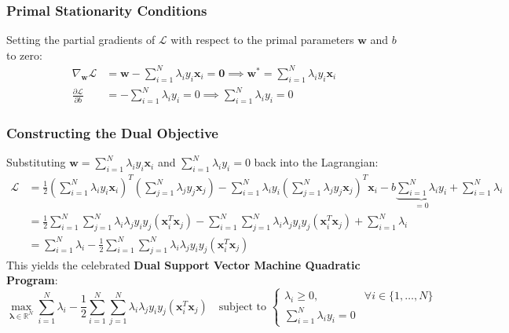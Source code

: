 \subsubsection{Primal Stationarity Conditions}
Setting the partial gradients of $\mathcal{L}$ with respect to the primal parameters $\mathbf{w}$ and $b$ to zero:
\begin{align}
\nabla_{\mathbf{w}} \mathcal{L} &= \mathbf{w} - \sum_{i=1}^N \lambda_i y_i \mathbf{x}_i = \mathbf{0} \implies \mathbf{w}^* = \sum_{i=1}^N \lambda_i y_i \mathbf{x}_i \label{eq:svm_w_stat} \\
\frac{\partial \mathcal{L}}{\partial b} &= -\sum_{i=1}^N \lambda_i y_i = 0 \implies \sum_{i=1}^N \lambda_i y_i = 0 \label{eq:svm_b_stat}
\end{align}

\subsubsection{Constructing the Dual Objective}
Substituting $\mathbf{w} = \sum_{i=1}^N \lambda_i y_i \mathbf{x}_i$ and $\sum_{i=1}^N \lambda_i y_i = 0$ back into the Lagrangian:
\begin{align}
\mathcal{L} &= \frac{1}{2} \left( \sum_{i=1}^N \lambda_i y_i \mathbf{x}_i \right)^T \left( \sum_{j=1}^N \lambda_j y_j \mathbf{x}_j \right) - \sum_{i=1}^N \lambda_i y_i \left( \sum_{j=1}^N \lambda_j y_j \mathbf{x}_j \right)^T \mathbf{x}_i - b \underbrace{\sum_{i=1}^N \lambda_i y_i}_{= 0} + \sum_{i=1}^N \lambda_i \nonumber \\
&= \frac{1}{2} \sum_{i=1}^N \sum_{j=1}^N \lambda_i \lambda_j y_i y_j (\mathbf{x}_i^T \mathbf{x}_j) - \sum_{i=1}^N \sum_{j=1}^N \lambda_i \lambda_j y_i y_j (\mathbf{x}_i^T \mathbf{x}_j) + \sum_{i=1}^N \lambda_i \nonumber \\
&= \sum_{i=1}^N \lambda_i - \frac{1}{2} \sum_{i=1}^N \sum_{j=1}^N \lambda_i \lambda_j y_i y_j (\mathbf{x}_i^T \mathbf{x}_j)
\end{align}
This yields the celebrated \textbf{Dual Support Vector Machine Quadratic Program}:
\begin{equation}
\max_{\boldsymbol{\lambda} \in \mathbb{R}^N} \sum_{i=1}^N \lambda_i - \frac{1}{2} \sum_{i=1}^N \sum_{j=1}^N \lambda_i \lambda_j y_i y_j (\mathbf{x}_i^T \mathbf{x}_j) \quad \text{subject to } \begin{cases} \lambda_i \ge 0, & \forall i \in \{1, \dots, N\} \\ \sum_{i=1}^N \lambda_i y_i = 0 & \end{cases}
\label{eq:svm_dual_qp}
\end{equation}

